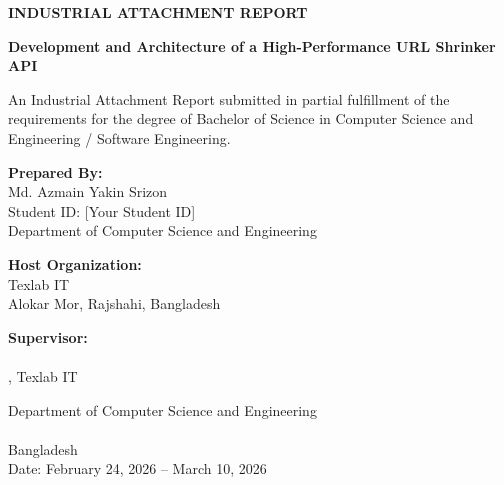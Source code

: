 \begin{titlepage}
    \begin{center}
        \vspace*{1cm}
        
        \Huge
        \textbf{INDUSTRIAL ATTACHMENT REPORT}
        
        \vspace{1.5cm}
        
        \Large
        \textbf{Development and Architecture of a High-Performance URL Shrinker API}
        
        \vspace{0.8cm}
        \large
        An Industrial Attachment Report submitted in partial fulfillment of the requirements for the degree of Bachelor of Science in Computer Science and Engineering / Software Engineering.
        
        \vspace{1.5cm}
        
        \textbf{Prepared By:} \\
        Md. Azmain Yakin Srizon \\
        Student ID: [Your Student ID] \\
        Department of Computer Science and Engineering
        
        \vspace{1.5cm}
        
        \textbf{Host Organization:} \\
        Texlab IT \\
        Alokar Mor, Rajshahi, Bangladesh \\
        
        \vspace{1.5cm}
        
        \textbf{Supervisor:} \\
        [Supervisor's Name] \\
        [Supervisor's Designation], Texlab IT \\
        
        \vfill
        
        \vspace{0.8cm}
        
        \Large
        Department of Computer Science and Engineering \\
        [Your University/Institute Name] \\
        Bangladesh \\
        \vspace{0.5cm}
        Date: February 24, 2026 -- March 10, 2026
        
    \end{center}
\end{titlepage}
